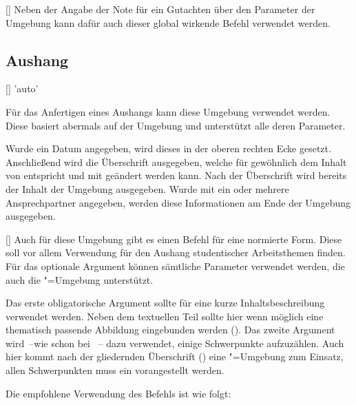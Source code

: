 \begin{Bundle*}{}
\begin{Declaration}{[]}
\printdeclarationlist%
%
Neben der Angabe der Note für ein Gutachten über den Parameter 
 der Umgebung  
kann dafür auch dieser global wirkende Befehl verwendet werden.
\end{Declaration}


\subsection{Aushang}
%
%
\begin{Declaration}{[]}{%
  'auto'%
}
\begin{Declaration}{}
\printdeclarationlist%
%
Für das Anfertigen eines Aushangs kann diese Umgebung verwendet werden. Diese 
basiert abermals auf der Umgebung  und unterstützt alle 
deren Parameter.

Wurde ein Datum angegeben, wird dieses in der oberen rechten Ecke gesetzt. 
Anschließend wird die Überschrift ausgegeben, welche für gewöhnlich dem Inhalt 
von  entspricht und mit  
geändert werden kann. Nach der Überschrift wird bereits der Inhalt der Umgebung 
ausgegeben. Wurde mit  ein oder mehrere Ansprechpartner 
angegeben, werden diese Informationen am Ende der Umgebung ausgegeben.
\end{Declaration}
\end{Declaration}

\begin{Declaration}{%
  [\LParameter{}]%
}
\printdeclarationlist%
%
Auch für diese Umgebung gibt es einen Befehl für eine normierte Form. Diese 
soll vor allem Verwendung für den Aushang studentischer Arbeitsthemen finden. 
Für das optionale Argument können sämtliche Parameter verwendet werden, die 
auch die "=Umgebung unterstützt.

Das erste obligatorische Argument sollte für eine kurze Inhaltsbeschreibung 
verwendet werden. Neben dem textuellen Teil sollte hier wenn möglich eine 
thematisch passende Abbildung eingebunden werden (). Das 
zweite Argument wird~--wie schon bei ~-- dazu verwendet, einige 
Schwerpunkte aufzuzählen. Auch hier kommt nach der gliedernden Überschrift 
() eine "=Umgebung zum Einsatz, allen 
Schwerpunkten muss ein  vorangestellt werden.
\end{Declaration}
%
\begin{Example}
Die empfohlene Verwendung des Befehls  ist wie folgt:
\begin{Code}[escapechar=§]
\end{Code}
\end{Example}
\end{Bundle*}
